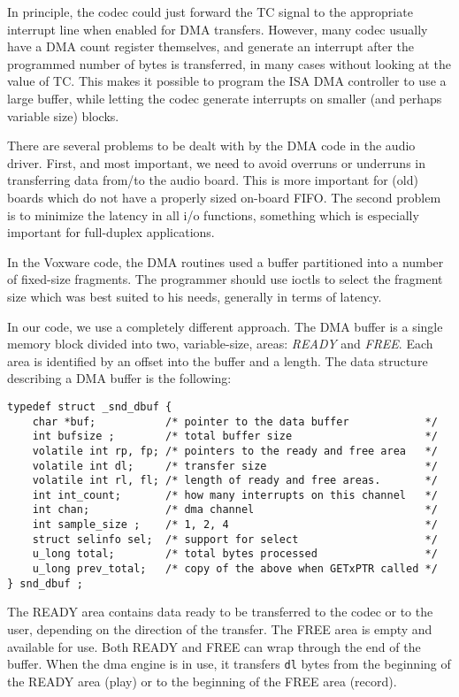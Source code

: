 \documentclass[11pt]{article}
\begin{document}
In principle, the codec could just forward the TC signal to the
appropriate interrupt line when enabled for DMA transfers. However,
many codec usually have a DMA count register themselves, and generate
an interrupt after the programmed number of bytes is transferred,
in many cases without looking at the value of TC. This makes it
possible to program the ISA DMA controller to use a large buffer,
while letting the codec generate interrupts on smaller (and perhaps
variable size) blocks.

There are several problems to be dealt with by the DMA code in the
audio driver. First, and most important, we need to avoid overruns
or underruns in transferring data from/to the audio board. This is
more important for (old) boards which do not have a properly sized
on-board FIFO.  The second problem is to minimize the latency in
all i/o functions, something which is especially important for
full-duplex applications.

In the Voxware code, the DMA routines used a buffer partitioned into
a number of fixed-size fragments. The programmer should use ioctls to
select the fragment size which was best suited to his needs,
generally in terms of latency.

In our code, we use a completely different approach. The DMA buffer
is a single memory block divided into two, variable-size, areas:
{\em READY} and {\em FREE}. Each area is identified by an
offset into the buffer and a length. The data structure describing a
DMA buffer is the following:
\begin{verbatim}
typedef struct _snd_dbuf { 
    char *buf;           /* pointer to the data buffer            */
    int bufsize ;        /* total buffer size                     */
    volatile int rp, fp; /* pointers to the ready and free area   */
    volatile int dl;     /* transfer size                         */
    volatile int rl, fl; /* length of ready and free areas.       */
    int int_count;       /* how many interrupts on this channel   */
    int chan;            /* dma channel                           */
    int sample_size ;    /* 1, 2, 4                               */
    struct selinfo sel;  /* support for select                    */
    u_long total;        /* total bytes processed                 */
    u_long prev_total;   /* copy of the above when GETxPTR called */
} snd_dbuf ;
\end{verbatim}
The READY area contains
data ready to be transferred to the codec or to the user, depending
on the direction of the transfer. The FREE area is empty and
available for use. Both READY and FREE can wrap through the end of
the buffer. When the dma engine is in use, it transfers {\tt dl} bytes
from the beginning of the READY area (play) or to the beginning of the
FREE area (record).
\end{document}
